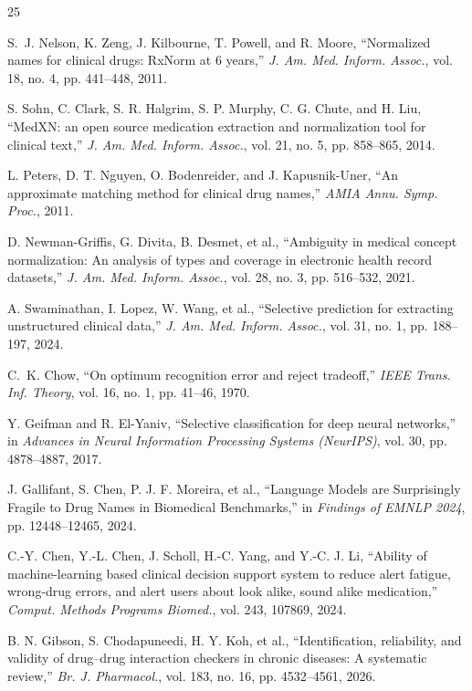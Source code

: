 \documentclass[11pt]{article}
\begin{document}
\begin{thebibliography}{25}

S.~J. Nelson, K. Zeng, J. Kilbourne, T. Powell, and R. Moore,
``Normalized names for clinical drugs: RxNorm at 6 years,''
\emph{J. Am. Med. Inform. Assoc.}, vol. 18, no. 4, pp. 441--448, 2011.

S. Sohn, C. Clark, S. R. Halgrim, S. P. Murphy, C. G. Chute, and H. Liu,
``MedXN: an open source medication extraction and normalization tool for clinical text,''
\emph{J. Am. Med. Inform. Assoc.}, vol. 21, no. 5, pp. 858--865, 2014.

L. Peters, D. T. Nguyen, O. Bodenreider, and J. Kapusnik-Uner,
``An approximate matching method for clinical drug names,''
\emph{AMIA Annu. Symp. Proc.}, 2011.

D. Newman-Griffis, G. Divita, B. Desmet, et al.,
``Ambiguity in medical concept normalization: An analysis of types and coverage in electronic health record datasets,''
\emph{J. Am. Med. Inform. Assoc.}, vol. 28, no. 3, pp. 516--532, 2021.

A. Swaminathan, I. Lopez, W. Wang, et al.,
``Selective prediction for extracting unstructured clinical data,''
\emph{J. Am. Med. Inform. Assoc.}, vol. 31, no. 1, pp. 188--197, 2024.

C.~K. Chow,
``On optimum recognition error and reject tradeoff,''
\emph{IEEE Trans. Inf. Theory}, vol. 16, no. 1, pp. 41--46, 1970.

Y. Geifman and R. El-Yaniv,
``Selective classification for deep neural networks,''
in \emph{Advances in Neural Information Processing Systems (NeurIPS)}, vol. 30, pp. 4878--4887, 2017.

J. Gallifant, S. Chen, P. J. F. Moreira, et al.,
``Language Models are Surprisingly Fragile to Drug Names in Biomedical Benchmarks,''
in \emph{Findings of EMNLP 2024}, pp. 12448--12465, 2024.

C.-Y. Chen, Y.-L. Chen, J. Scholl, H.-C. Yang, and Y.-C. J. Li,
``Ability of machine-learning based clinical decision support system to reduce alert fatigue, wrong-drug errors, and alert users about look alike, sound alike medication,''
\emph{Comput. Methods Programs Biomed.}, vol. 243, 107869, 2024.

B. N. Gibson, S. Chodapuneedi, H. Y. Koh, et al.,
``Identification, reliability, and validity of drug--drug interaction checkers in chronic diseases: A systematic review,''
\emph{Br. J. Pharmacol.}, vol. 183, no. 16, pp. 4532--4561, 2026.


\end{thebibliography}
\end{document}
